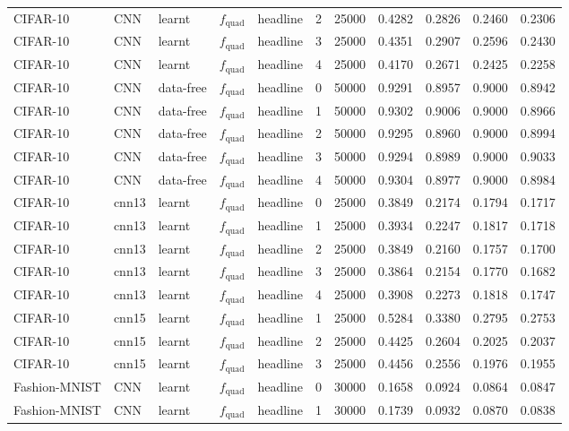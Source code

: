 {\begin{longtable}[]{@{}lllllr r r r r r@{}}
CIFAR-10 & CNN & learnt & $f_{\text{quad}}$ & headline & 2 & 25000 & 0.4282 & 0.2826 & 0.2460 & 0.2306 \\
CIFAR-10 & CNN & learnt & $f_{\text{quad}}$ & headline & 3 & 25000 & 0.4351 & 0.2907 & 0.2596 & 0.2430 \\
CIFAR-10 & CNN & learnt & $f_{\text{quad}}$ & headline & 4 & 25000 & 0.4170 & 0.2671 & 0.2425 & 0.2258 \\
\addlinespace[2pt]
CIFAR-10 & CNN & data-free & $f_{\text{quad}}$ & headline & 0 & 50000 & 0.9291 & 0.8957 & 0.9000 & 0.8942 \\
CIFAR-10 & CNN & data-free & $f_{\text{quad}}$ & headline & 1 & 50000 & 0.9302 & 0.9006 & 0.9000 & 0.8966 \\
CIFAR-10 & CNN & data-free & $f_{\text{quad}}$ & headline & 2 & 50000 & 0.9295 & 0.8960 & 0.9000 & 0.8994 \\
CIFAR-10 & CNN & data-free & $f_{\text{quad}}$ & headline & 3 & 50000 & 0.9294 & 0.8989 & 0.9000 & 0.9033 \\
CIFAR-10 & CNN & data-free & $f_{\text{quad}}$ & headline & 4 & 50000 & 0.9304 & 0.8977 & 0.9000 & 0.8984 \\
\addlinespace[2pt]
CIFAR-10 & cnn13 & learnt & $f_{\text{quad}}$ & headline & 0 & 25000 & 0.3849 & 0.2174 & 0.1794 & 0.1717 \\
CIFAR-10 & cnn13 & learnt & $f_{\text{quad}}$ & headline & 1 & 25000 & 0.3934 & 0.2247 & 0.1817 & 0.1718 \\
CIFAR-10 & cnn13 & learnt & $f_{\text{quad}}$ & headline & 2 & 25000 & 0.3849 & 0.2160 & 0.1757 & 0.1700 \\
CIFAR-10 & cnn13 & learnt & $f_{\text{quad}}$ & headline & 3 & 25000 & 0.3864 & 0.2154 & 0.1770 & 0.1682 \\
CIFAR-10 & cnn13 & learnt & $f_{\text{quad}}$ & headline & 4 & 25000 & 0.3908 & 0.2273 & 0.1818 & 0.1747 \\
\addlinespace[2pt]
CIFAR-10 & cnn15 & learnt & $f_{\text{quad}}$ & headline & 1 & 25000 & 0.5284 & 0.3380 & 0.2795 & 0.2753 \\
CIFAR-10 & cnn15 & learnt & $f_{\text{quad}}$ & headline & 2 & 25000 & 0.4425 & 0.2604 & 0.2025 & 0.2037 \\
CIFAR-10 & cnn15 & learnt & $f_{\text{quad}}$ & headline & 3 & 25000 & 0.4456 & 0.2556 & 0.1976 & 0.1955 \\
\addlinespace[2pt]
Fashion-MNIST & CNN & learnt & $f_{\text{quad}}$ & headline & 0 & 30000 & 0.1658 & 0.0924 & 0.0864 & 0.0847 \\
Fashion-MNIST & CNN & learnt & $f_{\text{quad}}$ & headline & 1 & 30000 & 0.1739 & 0.0932 & 0.0870 & 0.0838 \\

\end{longtable}}
